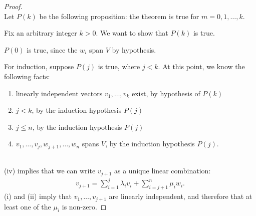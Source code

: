 \documentclass[12pt]{article}
\begin{document}
\begin{proof}~\\
  Let $P(k)$ be the following proposition: the theorem is true for $m = 0, 1, \ldots, k$.

  Fix an arbitrary integer $k > 0$. We want to show that $P(k)$ is true.

  $P(0)$ is true, since the $w_i$ span $V$ by hypothesis.

  For induction, suppose $P(j)$ is true, where $j < k$. At this point, we know
  the following facts:~\\

  \begin{enumerate}[label=\roman*)]
  \item linearly independent vectors $v_1, \ldots, v_k$ exist, by hypothesis of $P(k)$
  \item $j < k$, by the induction hypothesis $P(j)$
  \item $j \leq n$, by the induction hypothesis $P(j)$
  \item $v_1, \ldots, v_j, w_{j+1}, \ldots, w_n$ spans $V$, by the induction hypothesis $P(j)$.
  \end{enumerate}
  ~\\
  (iv) implies that we can write $v_{j+1}$ as a unique linear combination:
  \begin{align*}
    v_{j+1} = \sum_{i=1}^j \lambda_iv_i + \sum_{i=j+1}^n\mu_iw_i.
  \end{align*}
  (i) and (ii) imply that $v_1, \ldots, v_{j+1}$ are linearly independent, and
  therefore that at least one of the $\mu_i$ is non-zero.















\end{proof}
\end{document}

